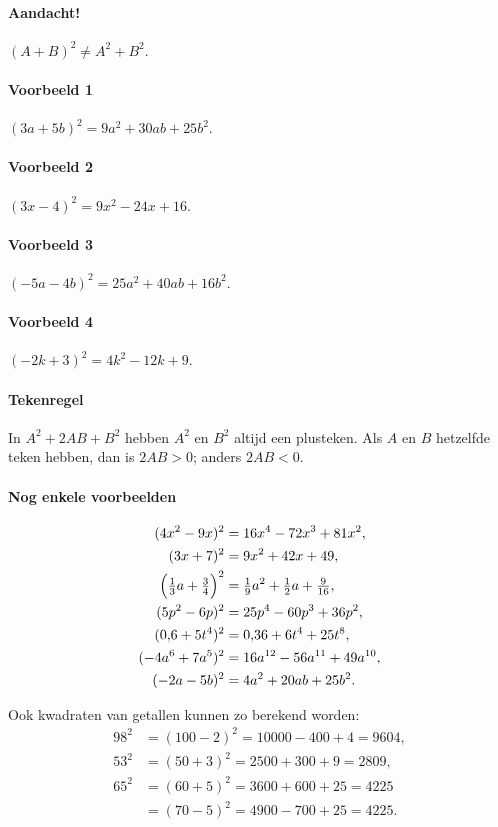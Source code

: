 \documentclass[a4paper,12pt]{article}
\begin{document}
\paragraph*{Aandacht!} \((A+B)^2\neq A^2+B^2\).

\paragraph*{Voorbeeld 1}
\((3a+5b)^2=9a^2+30ab+25b^2\).

\paragraph*{Voorbeeld 2}
\((3x-4)^2=9x^2-24x+16\).

\paragraph*{Voorbeeld 3}
\(({-}5a-4b)^2=25a^2+40ab+16b^2\).

\paragraph*{Voorbeeld 4}
\(({-}2k+3)^2=4k^2-12k+9\).

\paragraph*{Tekenregel}
In \(A^2+2AB+B^2\) hebben \(A^2\) en \(B^2\) altijd een plusteken. Als \(A\) en \(B\) hetzelfde teken hebben, dan is \(2AB>0\); anders \(2AB<0\).

\paragraph*{Nog enkele voorbeelden}
\[
\begin{aligned}
(4x^2-9x)^2 &= 16x^4-72x^3+81x^2,\\
(3x+7)^2 &= 9x^2+42x+49,\\
\Bigl(\tfrac{1}{3}a+\tfrac{3}{4}\Bigr)^2 &= \tfrac{1}{9}a^2+\tfrac{1}{2}a+\tfrac{9}{16},\\
(5p^2-6p)^2 &= 25p^4-60p^3+36p^2,\\
(0{,}6+5t^4)^2 &= 0{,}36+6t^4+25t^8,\\
({-}4a^6+7a^5)^2 &= 16a^{12}-56a^{11}+49a^{10},\\
({-}2a-5b)^2 &= 4a^2+20ab+25b^2.
\end{aligned}
\]

Ook kwadraten van getallen kunnen zo berekend worden:
\[
\begin{aligned}
98^2&=(100-2)^2=10000-400+4=9604,\\
53^2&=(50+3)^2=2500+300+9=2809,\\
65^2&=(60+5)^2=3600+600+25=4225\\
     &=(70-5)^2=4900-700+25=4225.
\end{aligned}
\]
\end{document}
